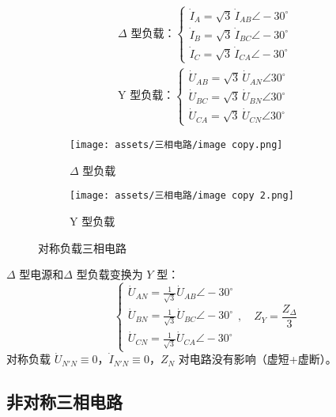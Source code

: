 \documentclass[a4paper]{article}  %
\theoremstyle{MyLineTheoremStyle} %
\theoremstyle{MyBlockTheoremStyle} %
\theoremstyle{MySubsubsectionStyle} %
\begin{document}
\begin{multicols*}{4}
\begin{gather}
    \text{$\Delta$ 型负载：}
    \begin{cases}
        \dot{I}_A = \sqrt{3} \, \dot{I}_{AB} \angle -30^\circ \\
        \dot{I}_B = \sqrt{3} \, \dot{I}_{BC} \angle -30^\circ \\
        \dot{I}_C = \sqrt{3} \, \dot{I}_{CA} \angle -30^\circ
    \end{cases}
    \\
    \text{Y 型负载：}
    \begin{cases}
        \dot{U}_{AB} = \sqrt{3} \, \dot{U}_{AN} \angle 30^\circ \\
        \dot{U}_{BC} = \sqrt{3} \, \dot{U}_{BN} \angle 30^\circ \\
        \dot{U}_{CA} = \sqrt{3} \, \dot{U}_{CN} \angle 30^\circ
    \end{cases}
\end{gather}

\begin{figure}[H]\centering
\begin{subfigure}[b]{0.5\columnwidth}\centering
    \texttt{[image: assets/三相电路/image copy.png]}
    \caption{$\Delta$ 型负载}
\end{subfigure}\hfill
\begin{subfigure}[b]{0.5\columnwidth}\centering
    \texttt{[image: assets/三相电路/image copy 2.png]}
    \caption{Y 型负载}
\end{subfigure}
\caption{对称负载三相电路}
\end{figure}

$\Delta$ 型电源和$\Delta$ 型负载变换为 $Y$ 型：
\begin{equation}
\begin{cases}
\dot{U}_{AN} = \frac{1}{\sqrt{3}} \dot{U}_{AB} \angle -30^\circ \\
\dot{U}_{BN} = \frac{1}{\sqrt{3}} \dot{U}_{BC} \angle -30^\circ \\
\dot{U}_{CN} = \frac{1}{\sqrt{3}} \dot{U}_{CA} \angle -30^\circ
\end{cases},\quad 
Z_{Y} = \frac{Z_{\Delta}}{3}
\end{equation}
对称负载 $\dot{U}_{N'N} \equiv 0$，$\dot{I}_{N'N} \equiv 0$，$Z_N$ 对电路没有影响（虚短+虚断）。

\subsection{非对称三相电路}


\end{multicols*}
\end{document}
